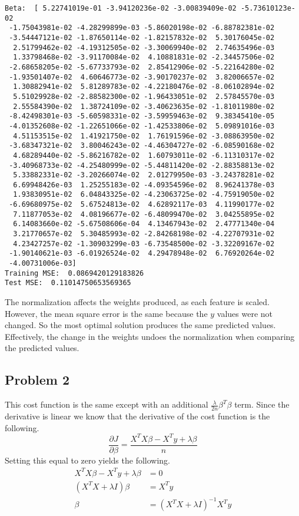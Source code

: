 \documentclass[12pt]{article}
\begin{document}
\begin{verbatim}
Beta:  [ 5.22741019e-01 -3.94120236e-02 -3.00839409e-02 -5.73610123e-02
 -1.75043981e-02 -4.28299899e-03 -5.86020198e-02 -6.88782381e-02
 -3.54447121e-02 -1.87650114e-02 -1.82157832e-02  5.30176045e-02
  2.51799462e-02 -4.19312505e-02 -3.30069940e-02  2.74635496e-03
  1.33798468e-02 -3.91170084e-02  4.10881831e-02 -2.34457506e-02
 -2.68658205e-02 -5.67733793e-02  2.85412906e-02 -5.22164280e-02
 -1.93501407e-02  4.60646773e-02 -3.90170237e-02  3.82006657e-02
  1.30882941e-02  5.81289783e-02 -4.22180476e-02 -8.06102894e-02
  5.51029928e-02 -2.88582300e-02 -1.96433051e-02  2.57845570e-03
  2.55584390e-02  1.38724109e-02 -3.40623635e-02 -1.81011980e-02
 -8.42498301e-03 -5.60598331e-02 -3.59959463e-02  9.38345410e-05
 -4.01352608e-02 -1.22651066e-02 -1.42533806e-02  5.09891016e-03
  4.51153515e-02  1.41921750e-02  1.76191596e-02 -3.08863950e-02
 -3.68347321e-02  3.80046243e-02 -4.46304727e-02 -6.08590168e-02
  4.68289440e-02 -5.86216782e-02  1.60793011e-02 -6.11310317e-02
 -3.40968733e-02 -4.25480999e-02 -5.44811420e-02 -2.88358813e-02
  5.33882331e-02 -3.20266074e-02  2.01279950e-03 -3.24378281e-02
  6.69948426e-03  1.25255183e-02 -4.09354596e-02  8.96241378e-03
  1.93830951e-02  6.04843325e-02 -4.23063725e-02 -4.75919050e-02
 -6.69680975e-02  5.67524813e-02  4.62892117e-03  4.11990177e-02
  7.11877053e-02  4.08196677e-02 -6.48099470e-02  3.04255895e-02
  6.14083660e-02 -5.67508606e-04  4.13467943e-02  2.47771340e-04
  3.21770657e-02  5.30485993e-02 -2.84268198e-02 -4.22707931e-02
  4.23427257e-02 -1.30903299e-03 -6.73548500e-02 -3.32209167e-02
 -1.90140621e-03 -6.01926524e-02  4.29478948e-02  6.76920264e-02
 -4.00731006e-03]
Training MSE:  0.0869420129183826
Test MSE:  0.11014750653569365
\end{verbatim}
\normalsize
The normalization affects the weights produced, as each feature is scaled. However, the mean square error is
the same because the \(y\) values were not changed. So the most optimal solution produces the same predicted values.
Effectively, the change in the weights undoes the normalization when comparing the predicted values.

\subsection*{Problem 2}

This cost function is the same except with an additional \(\frac{\lambda}{2n}\beta^T\beta\) term. Since the derivative
is linear we know that the derivative of the cost function is the following.
\[\frac{\partial J}{\partial \beta}=\frac{X^TX\beta-X^Ty+\lambda\beta}{n}\]
Setting this equal to zero yields the following.
\begin{align*}
    X^TX\beta-X^Ty+\lambda\beta &= 0\\
    (X^TX + \lambda I)\beta &= X^Ty\\
    \beta &= (X^TX + \lambda I)^{-1}X^Ty
\end{align*}
\end{document}
